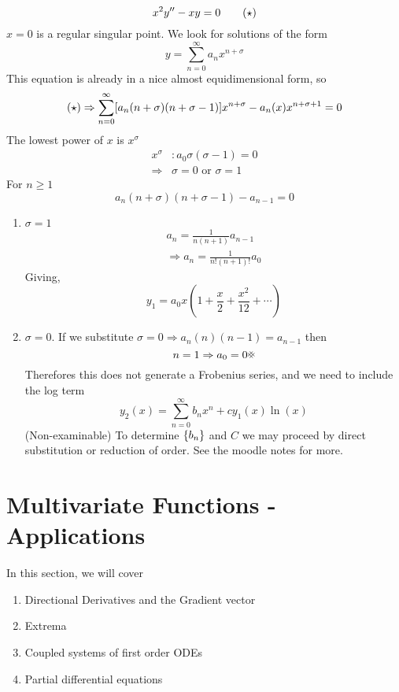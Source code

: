 \documentclass{article}
\begin{document}
\begin{eg}
    \[
        x^2 y'' - xy = 0 \tagstar  
    \]
    $x = 0$ is a regular singular point. We look for solutions of the form
    \[
        y = \sum_{n=0}^{\infty} a_n x^{n + \sigma}  \tag{$a_0 \neq 0$}
    \]
    This equation is already in a nice almost equidimensional form, so
    \[
        \text{($\star$)} \Rightarrow \sum_{n=0}^{\infty} [a_n (n+\sigma)(n+\sigma -1)]x^{n + \sigma} - a_n (x) x^{n + \sigma + 1} = 0\\
    \]
    The lowest power of $x$ is $x^\sigma$
    \begin{align*}
        x^\sigma&: a_0 \sigma (\sigma -1) = 0 \\
        \Rightarrow& \sigma = 0 \text{ or } \sigma = 1
    \end{align*}
    For $n \geq 1$
    \[
        a_n (n + \sigma)(n + \sigma -1) - a_{n-1} = 0  
    \]
    \begin{enumerate}[cases]
        \item $\sigma = 1$
        \begin{align*}
            a_n = \frac{1}{n(n+1)} a_{n-1} \\
            \Rightarrow a_n = \frac{1}{n! (n+1)!} a_0
        \end{align*}
        Giving,
        \[
            y_1 = a_0 x(1 + \frac{x}{2} + \frac{x^2}{12} + \cdots)    
        \]
        
        \item $\sigma = 0$. If we substitute $\sigma = 0 \Rightarrow a_n(n)(n-1) = a_{n-1}$ then
        \[
            n = 1 \Rightarrow a_0 = 0 \contradiction  
        \]
        Therefores this does not generate a Frobenius series, and we need to include the log term
        \[
            y_2(x) = \sum_{n=0}^{\infty} b_n x^n + c y_1(x) \ln(x)    
        \]
        (Non-examinable) To determine $\left\{ b_n \right\}$ and $C$ we may proceed by direct substitution or reduction of order. 
        See the moodle notes for more.
    \end{enumerate}
\end{eg}


\section{Multivariate Functions - Applications}
In this section, we will cover
\begin{enumerate}
    \item Directional Derivatives and the Gradient vector
    \item Extrema
    \item Coupled systems of first order ODEs
    \item Partial differential equations
\end{enumerate}
\end{document}
